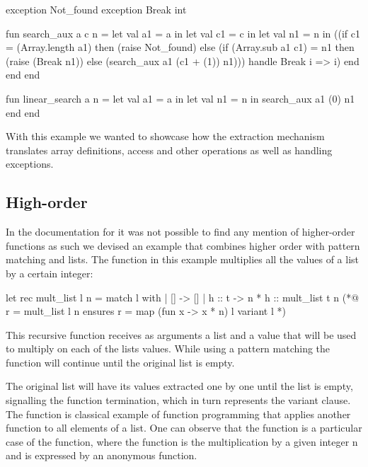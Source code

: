 \begin{cakeml}

exception Not_found
exception Break int

fun search_aux a c n = let val a1 = a in
  let val c1 = c in
  let val n1 = n in
  ((if c1 = (Array.length a1) then (raise Not_found) 
    else (if (Array.sub  a1 c1) = n1 then (raise (Break n1)) 
          else (search_aux a1 (c1 + (1)) n1)))
  handle Break i => i)
  end end end

fun linear_search a n =
  let val a1 = a in let val n1 = n in search_aux a1 (0) n1 
  end end

\end{cakeml}

With this example we wanted to showcase how the extraction mechanism translates array definitions, access and other operations 
as well as handling exceptions.

\subsection{High-order}

In the documentation for \cml it was not possible to find any mention of higher-order functions as such we devised an example that
combines higher order with pattern matching and lists. The function in this example multiplies all the values of a list by a certain
integer:

\begin{gospell}
let rec mult_list l n =
    match l with
    | [] -> []
    | h :: t -> n * h :: mult_list t n
(*@ r = mult_list l n
        ensures r = map (fun x -> x * n) l
        variant l *)
\end{gospell}

This recursive function  receives as arguments a list and a value that will be used to multiply on each of the
lists values. While using a pattern matching the function will continue until the original list is empty.

The original list will have its values extracted one by one until the list is empty, signalling the function termination, which in turn
represents the variant clause. The function  is classical example of function programming that applies another function 
to all elements of a list. One can observe that the  function is a particular case of the  
function, where the function is the multiplication by a given integer n and is expressed by an anonymous function. 

